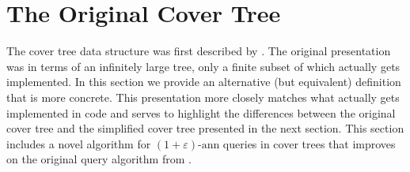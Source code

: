 \documentclass[thesis.tex]{subfiles}
\newcommand{\eann}{(1+\varepsilon)\text{-ann}}
\begin{document}

\section{The Original Cover Tree}
\label{sec:original}

The cover tree data structure was first described by \cite{beygelzimer2006cover}.
The original presentation was in terms of an infinitely large tree,
only a finite subset of which actually gets implemented.
In this section we provide an alternative (but equivalent) definition that is more concrete.
This presentation more closely matches what actually gets implemented in code and serves to highlight the differences between the original cover tree and the simplified cover tree presented in the next section.
This section includes a novel algorithm for $\eann$ queries in cover trees that improves on the original query algorithm from \cite{beygelzimer2006cover}.
\end{document}
